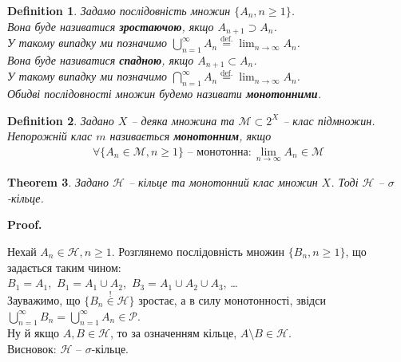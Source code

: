 \documentclass[a4paper, 10pt]{article}
\makeatletter
\theoremstyle{theoremdd}
\newtheorem{theorem}{Theorem}[subsection]
\newtheorem{definition}[theorem]{Definition}
\renewenvironment{proof}[1][Proof.\\]{\par
\pushQED{\hfill \qed}%
\normalfont \topsep6\p@\@plus6\p@\relax
\trivlist
\item\relax
{\bfseries
#1\@addpunct{.}}\hspace\labelsep\ignorespaces
}{%
\popQED\endtrivlist\@endpefalse
}
\makeatother
\begin{document}
\begin{definition}
Задамо послідовність множин $\{A_n, n \geq 1\}$.\\
Вона буде називатися \textbf{зростаючою}, якщо $A_{n+1} \supset A_n$. \\
У такому випадку ми позначимо $\displaystyle\bigcup_{n=1}^\infty A_n \overset{\text{def.}}{=} \lim_{n \to \infty} A_n$.\\
Вона буде називатися \textbf{спадною}, якщо $A_{n+1} \subset A_n$. \\
У такому випадку ми позначимо $\displaystyle\bigcap_{n=1}^\infty A_n \overset{\text{def.}}{=} \lim_{n \to \infty} A_n$.\\
Обидві послідовності множин будемо називати \textbf{монотонними}.
\end{definition}

\begin{definition}
Задано $X$ -- деяка множина та $\mathcal{M} \subset 2^X$ -- клас підмножин.\\
Непорожній клас $m$ називається \textbf{монотонним}, якщо
\begin{align*}
\forall \{A_n \in \mathcal{M}, n \geq 1\} \text{ -- монотонна}: \displaystyle\lim_{n \to \infty} A_n \in \mathcal{M}
\end{align*}
\end{definition}

\begin{theorem}
\label{monotonic_ring_is_sigma_ring}
Задано $\mathcal{H}$ -- кільце та монотонний клас множин $X$. Тоді $\mathcal{H}$ -- $\sigma$-кільце.
\end{theorem}

\begin{proof}
Нехай $A_n \in \mathcal{H}, n \geq 1$. Розглянемо послідовність множин $\{B_n, n \geq 1\}$, що задається таким чином:\\
$B_1 = A_1$,\ $B_1 = A_1 \cup A_2$,\ $B_3 = A_1 \cup A_2 \cup A_3$, \dots\\
Зауважимо, що $\{B_n \overset{!}{\in} \mathcal{H}\}$ зростає, а в силу монотонності, звідси $\displaystyle\bigcup_{n=1}^\infty B_n = \bigcup_{n=1}^\infty A_n \in \mathcal{P}$.\\
Ну й якщо $A,B \in \mathcal{H}$, то за означенням кільце, $A \setminus B \in \mathcal{H}$.\\
Висновок: $\mathcal{H}$ -- $\sigma$-кільце.
\end{proof}
\end{document}
